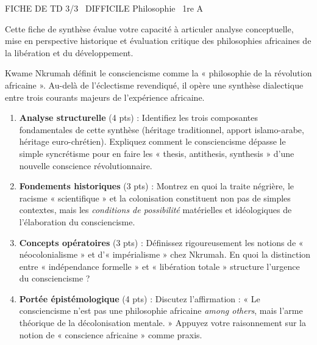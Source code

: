 \documentclass[11pt]{article}
\begin{document}
\begin{tcolorbox}[enhanced,colback=popink,colframe=popink,arc=10pt,boxrule=0pt,left=12pt,right=12pt,top=9pt,bottom=9pt]
{\color{white}\popxbold\small FICHE DE TD 3/3 \textbullet\ DIFFICILE \hfill Philosophie \textbullet\ 1re A\par}
\end{tcolorbox}
\vspace{4pt}
\noindent Cette fiche de synthèse évalue votre capacité à articuler analyse conceptuelle, mise en perspective historique et évaluation critique des philosophies africaines de la libération et du développement.

\begin{exercice}
Kwame Nkrumah définit le consciencisme comme la « philosophie de la révolution africaine ». Au-delà de l'éclectisme revendiqué, il opère une synthèse dialectique entre trois courants majeurs de l'expérience africaine.
\begin{enumerate}
    \item \textbf{Analyse structurelle} (4 pts) : Identifiez les trois composantes fondamentales de cette synthèse (héritage traditionnel, apport islamo-arabe, héritage euro-chrétien). Expliquez comment le consciencisme dépasse le simple syncrétisme pour en faire les « thesis, antithesis, synthesis » d'une nouvelle conscience révolutionnaire.
    \item \textbf{Fondements historiques} (3 pts) : Montrez en quoi la traite négrière, le racisme « scientifique » et la colonisation constituent non pas de simples contextes, mais les \textit{conditions de possibilité} matérielles et idéologiques de l'élaboration du consciencisme.
    \item \textbf{Concepts opératoires} (3 pts) : Définissez rigoureusement les notions de « néocolonialisme » et d'« impérialisme » chez Nkrumah. En quoi la distinction entre « indépendance formelle » et « libération totale » structure l'urgence du consciencisme ?
    \item \textbf{Portée épistémologique} (4 pts) : Discutez l'affirmation : « Le consciencisme n'est pas une philosophie africaine \textit{among others}, mais l'arme théorique de la décolonisation mentale. » Appuyez votre raisonnement sur la notion de « conscience africaine » comme praxis.
\end{enumerate}
\end{exercice}
\end{document}
